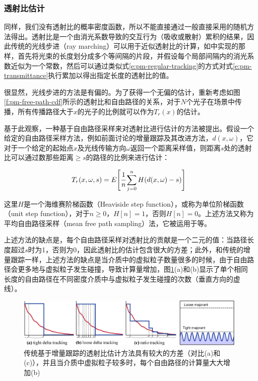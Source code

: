 \subsubsection{透射比估计}
同样，我们没有透射比的概率密度函数，所以不能直接通过一般直接采用的随机方法得出。透射比是一个由消光系数导致的交互行为（吸收或散射）累积的结果，因此传统的光线步进（ray marching）可以用于近似透射比的计算，如\cite{a:AComprehensiveTheoryofVolumetricRadianceEstimationusingPhotonPointsandBeams}中实现的那样，首先将光束的长度划分成多个等间隔的片段，并假设每个局部间隔内的消光系数近似为一个常数，然后可以通过类似式\ref{e:pm-regular-tracking}的方式对式\ref{e:pm-transmittance}执行累加以得出指定长度的透射比的值。

很显然，光线步进的方法是有偏的。为了获得一个无偏的估计，重新考虑如图\ref{f:pm-free-path-cdf}所示的透射比和自由路径的关系，对于$N$个光子在场景中传播，所有传播路径大于$x$的光子的比例就可以作为$T_r(x)$的估计。

基于此观察，一种基于自由路径采样来对透射比进行估计的方法被提出。假设一个给定的自由路径采样方法，例如前面讨论的增量跟踪及其改进方法，$d(x,{\omega})$，它对于一个给定的起始点$x$及光线传输方向${\omega}$返回一个距离采样值，则距离$s$处的透射比可以通过数那些距离$\geq s$的路径的比例来进行估计：

\begin{equation}
	T_r(x,{\omega},s)=E\Bigg[ \cfrac{1}{n}\sum^{n}_{j=0}H(d(x,{\omega})-s)\Bigg]
\end{equation}

这里$H$是一个海维赛阶梯函数（Heaviside step function），或称为单位阶梯函数（unit step function），对于$n\geq 0$，$H[n]=1$，否则$H[n]=0$。上述方法又称为平均自由路径采样（mean free path sampling）法，它被运用于\cite{a:ProgressivePhotonBeams,a:FreePathSamplinginHighResolutionInhomogeneousParticipatingMedia}等。

上述方法的缺点是，每个自由路径采样对透射比的贡献是一个二元的值：当路径长度超过$s$时为1，否则为0，因此透射比的估计包含很大的方差；此外，和传统的增量跟踪一样，上述方法的缺点是当介质中的虚拟粒子数量很多的时候，由于自由路径会更多地与虚拟粒子发生碰撞，导致计算量增加，图\ref{f:pm-delta-vs-ratio}(a)和(b)显示了单个相同长度的自由路径在不同密度介质中与虚拟粒子发生碰撞的次数（垂直方向的虚线）。

\begin{figure}
\begin{fullwidth}
	\includegraphics[width=\thewidth]{figures/pm/delta-vs-ratio}
	\caption{传统基于增量跟踪的透射比估计方法具有较大的方差（对比(a)和(c)），并且当介质中虚拟粒子较多时，每个自由路径的计算量大大增加(b)}
	\label{f:pm-delta-vs-ratio}
\end{fullwidth}
\end{figure}




